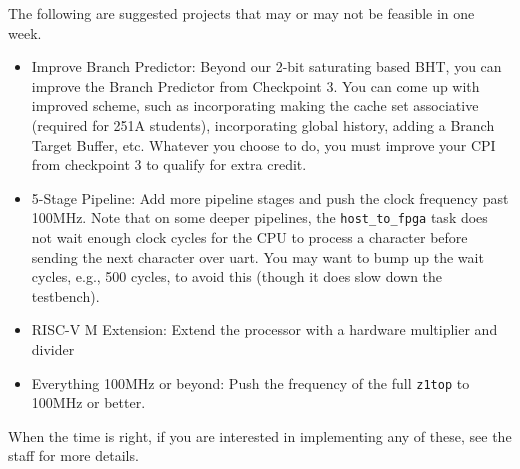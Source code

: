 The following are suggested projects that may or may not be feasible in one week.
\begin{itemize}
  \item Improve Branch Predictor: Beyond our 2-bit saturating based BHT, you can improve the Branch Predictor from Checkpoint 3. You can come up with improved scheme, such as incorporating making the cache set associative (required for 251A students), incorporating global history, adding a Branch Target Buffer, etc. Whatever you choose to do, you must improve your CPI from checkpoint 3 to qualify for extra credit.
  \item 5-Stage Pipeline: Add more pipeline stages and push the clock frequency past 100MHz. Note that on some deeper pipelines, the \texttt{host\_to\_fpga} task does not wait enough clock cycles for the CPU to process a character before sending the next character over uart. You may want to bump up the wait cycles, e.g., 500 cycles, to avoid this (though it does slow down the testbench).
  \item RISC-V M Extension: Extend the processor with a hardware multiplier and divider
  \item Everything 100MHz or beyond: Push the frequency of the full \verb|z1top| to 100MHz or better.
\end{itemize}

When the time is right, if you are interested in implementing any of these, see the staff for more details.



\newpage
